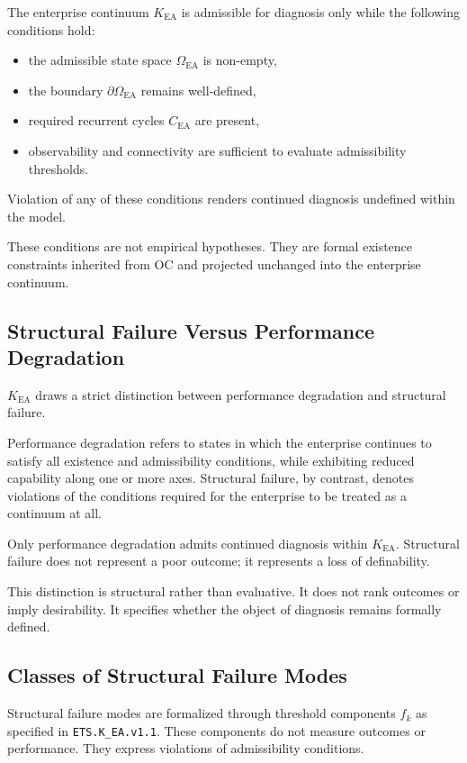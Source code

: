 The enterprise continuum $K_{\mathrm{EA}}$ is admissible for diagnosis
only while the following conditions hold:
\begin{itemize}
  \item the admissible state space $\Omega_{\mathrm{EA}}$ is non-empty,
  \item the boundary $\partial\Omega_{\mathrm{EA}}$ remains well-defined,
  \item required recurrent cycles $C_{\mathrm{EA}}$ are present,
  \item observability and connectivity are sufficient to evaluate
        admissibility thresholds.
\end{itemize}

Violation of any of these conditions renders continued diagnosis
undefined within the model.

These conditions are not empirical hypotheses.
They are formal existence constraints inherited from OC and projected
unchanged into the enterprise continuum.

\subsection{Structural Failure Versus Performance Degradation}

$K_{\mathrm{EA}}$ draws a strict distinction between performance
degradation and structural failure.

Performance degradation refers to states in which the enterprise
continues to satisfy all existence and admissibility conditions, while
exhibiting reduced capability along one or more axes.
Structural failure, by contrast, denotes violations of the conditions
required for the enterprise to be treated as a continuum at all.

Only performance degradation admits continued diagnosis within
$K_{\mathrm{EA}}$.
Structural failure does not represent a poor outcome; it represents a
loss of definability.

This distinction is structural rather than evaluative.
It does not rank outcomes or imply desirability.
It specifies whether the object of diagnosis remains formally defined.

\subsection{Classes of Structural Failure Modes}

Structural failure modes are formalized through threshold components
$f_k$ as specified in \texttt{ETS.K\_EA.v1.1}.
These components do not measure outcomes or performance.
They express violations of admissibility conditions.

